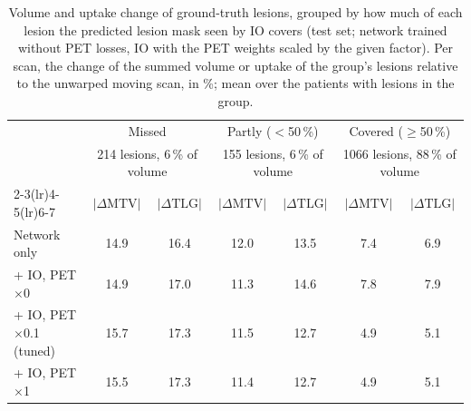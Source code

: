 \begin{table}[t]
\centering
\caption{Volume and uptake change of ground-truth lesions, grouped by how much of each lesion the predicted lesion mask seen by IO covers (test set; network trained without PET losses, IO with the PET weights scaled by the given factor). Per scan, the change of the summed volume or uptake of the group's lesions relative to the unwarped moving scan, in \%; mean over the patients with lesions in the group.}
\label{tab:detection_groups}
\scriptsize
\setlength{\tabcolsep}{3pt}
\begin{tabular}{lcccccc}
\toprule
 & \multicolumn{2}{c}{Missed} & \multicolumn{2}{c}{Partly ($<$50\,\%)} & \multicolumn{2}{c}{Covered ($\geq$50\,\%)} \\
 & \multicolumn{2}{c}{\tiny 214 lesions, 6\,\% of volume} & \multicolumn{2}{c}{\tiny 155 lesions, 6\,\% of volume} & \multicolumn{2}{c}{\tiny 1066 lesions, 88\,\% of volume} \\
\cmidrule(lr){2-3}\cmidrule(lr){4-5}\cmidrule(lr){6-7}
 & $|\Delta\mathrm{MTV}|$ & $|\Delta\mathrm{TLG}|$ & $|\Delta\mathrm{MTV}|$ & $|\Delta\mathrm{TLG}|$ & $|\Delta\mathrm{MTV}|$ & $|\Delta\mathrm{TLG}|$ \\
\midrule
Network only & 14.9 & 16.4 & 12.0 & 13.5 & 7.4 & 6.9 \\
\midrule
+ IO, PET $\times$0 & 14.9 & 17.0 & 11.3 & 14.6 & 7.8 & 7.9 \\
+ IO, PET $\times$0.1 (tuned) & 15.7 & 17.3 & 11.5 & 12.7 & 4.9 & 5.1 \\
+ IO, PET $\times$1 & 15.5 & 17.3 & 11.4 & 12.7 & 4.9 & 5.1 \\
\bottomrule
\end{tabular}
\end{table}
